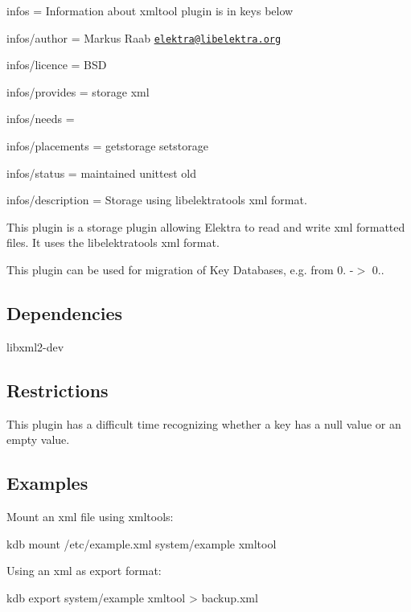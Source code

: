 
\begin{DoxyItemize}
\item infos = Information about xmltool plugin is in keys below
\item infos/author = Markus Raab \href{mailto:elektra@libelektra.org}{\tt elektra@libelektra.\+org}
\item infos/licence = B\+S\+D
\item infos/provides = storage xml
\item infos/needs =
\item infos/placements = getstorage setstorage
\item infos/status = maintained unittest old
\item infos/description = Storage using libelektratools xml format.
\end{DoxyItemize}

This plugin is a storage plugin allowing Elektra to read and write xml formatted files. It uses the libelektratools xml format.

This plugin can be used for migration of Key Databases, e.\+g. from 0. -\/$>$ 0..

\subsection*{Dependencies}


\begin{DoxyItemize}
\item {\ttfamily libxml2-\/dev}
\end{DoxyItemize}

\subsection*{Restrictions}

This plugin has a difficult time recognizing whether a key has a null value or an empty value.

\subsection*{Examples}

Mount an xml file using {\ttfamily xmltools}\+: \begin{DoxyVerb}    kdb mount /etc/example.xml system/example xmltool
\end{DoxyVerb}


Using an xml as export format\+: \begin{DoxyVerb}    kdb export system/example xmltool > backup.xml\end{DoxyVerb}
 